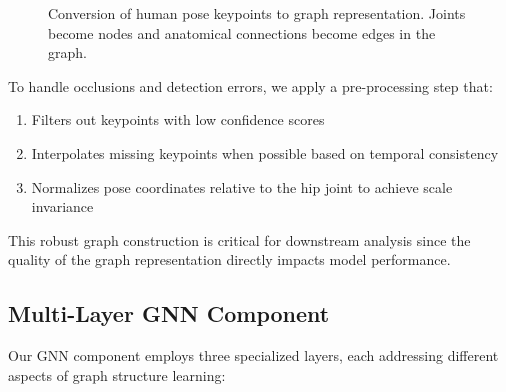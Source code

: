 \documentclass[conference]{IEEEtran}
\begin{document}
\begin{figure*}[htbp]
    \caption{Conversion of human pose keypoints to graph representation. Joints become nodes and anatomical connections become edges in the graph.}
    \label{fig:pose_graph}
\end{figure*}

To handle occlusions and detection errors, we apply a pre-processing step that:
\begin{enumerate}
    \item Filters out keypoints with low confidence scores
    \item Interpolates missing keypoints when possible based on temporal consistency
    \item Normalizes pose coordinates relative to the hip joint to achieve scale
          invariance
\end{enumerate}

This robust graph construction is critical for downstream analysis since the
quality of the graph representation directly impacts model performance.

\subsection{Multi-Layer GNN Component}
Our GNN component employs three specialized layers, each addressing different
aspects of graph structure learning:
\end{document}
